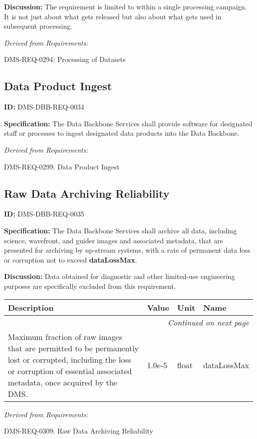 \documentclass[SE,toc]{lsstdoc}
\makeatletter
\newcommand{\paramname}[1]{\hspace{0pt}#1}
\newcommand{\unitname}[1]{\hspace{0pt}#1}
\newenvironment{parameters}[0]{%
\setlength\LTleft{0pt}
\setlength\LTright{\fill}
\begin{small}
\begin{longtable}[]{|p{0.49\textwidth}|l|p{0.6in}|p{1.70in}@{}|}

\hline \textbf{Description} & \textbf{Value} & \textbf{Unit} & \textbf{Name} \\ \hline
\endhead

\hline \multicolumn{4}{r}{\emph{Continued on next page}} \\
\endfoot

\hline\hline
\endlastfoot
}{%
\hline
\end{longtable}
\end{small}
}
\makeatother
\begin{document}
\textbf{Discussion:}
The requirement is limited to within a single processing campaign.   It is not just about what gets released but also about what gets used in subsequent processing.

\emph{Derived from Requirements:}

DMS-REQ-0294:
Processing of Datasets \newline

\subsection{Data Product Ingest}

\label{DMS-DBB-REQ-0034}
\textbf{ID:} DMS-DBB-REQ-0034

\textbf{Specification:}
The Data Backbone Services shall provide software for designated staff or processes to ingest designated data products into the Data Backbone.

\emph{Derived from Requirements:}

DMS-REQ-0299:
Data Product Ingest \newline

\subsection{Raw Data Archiving Reliability}

\label{DMS-DBB-REQ-0035}
\textbf{ID:} DMS-DBB-REQ-0035

\textbf{Specification:}
The Data Backbone Services shall archive all data, including science, wavefront, and guider images and associated metadata, that are presented for archiving by up-stream systems, with a rate of permanent data loss or corruption not to exceed \textbf{dataLossMax}.

\textbf{Discussion:}
Data obtained for diagnostic and other limited-use engineering purposes are specifically excluded from this requirement.

\begin{parameters}
Maximum fraction of raw images that are permitted to be permanently lost or corrupted, including the loss or corruption of essential associated metadata, once acquired by the DMS.
&
1.0e-5
&
\unitname{%
float
}
&
\paramname{%
dataLossMax
} \\\hline
\end{parameters}

\emph{Derived from Requirements:}

DMS-REQ-0309:
Raw Data Archiving Reliability \newline
\end{document}

